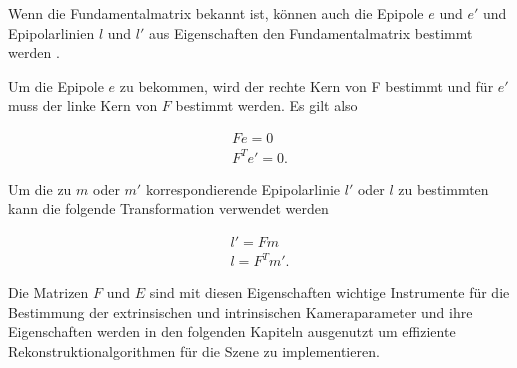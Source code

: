 
Wenn die Fundamentalmatrix bekannt ist, können auch die Epipole $e$ und $e'$ und Epipolarlinien $l$ und $l'$ aus Eigenschaften den Fundamentalmatrix bestimmt werden \cite{HZ,phdTwoView,HZ8,ZZGXr,phdextrinsicPara}. 

Um die Epipole $e$ zu bekommen, wird der rechte Kern von F bestimmt und für $e'$ muss der linke Kern von $F$ bestimmt werden\cite{HZ,phdTwoView,HZ8,ZZGXr,phdextrinsicPara}. Es gilt also%

\begin{gather}
	Fe = 0\\
	F^Te' = 0.
\end{gather}

Um die zu $m$ oder $m'$ korrespondierende Epipolarlinie $l'$ oder $l$ zu bestimmten kann die folgende Transformation verwendet werden\cite{HZ,phdTwoView,HZ8,ZZGXr,phdextrinsicPara}%

\begin{gather}
	l' = Fm\\
	l = F^Tm'.
\end{gather} 

Die Matrizen $F$ und $E$ sind mit diesen Eigenschaften wichtige Instrumente für die Bestimmung der extrinsischen und intrinsischen Kameraparameter und ihre Eigenschaften werden in den folgenden Kapiteln ausgenutzt um effiziente Rekonstruktionalgorithmen für die Szene zu implementieren. 




